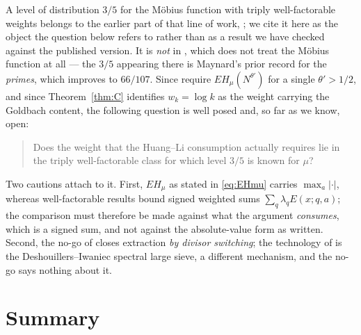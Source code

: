 \documentclass[11pt,a4paper]{article}
\theoremstyle{plain}
\theoremstyle{definition}
\theoremstyle{remark}
\begin{document}
A level of distribution $3/5$ for the M\"obius function with triply
well-factorable weights belongs to the earlier part of that line of
work, \cite{LiWF}; we cite it here as the object the question below
refers to rather than as a result we have checked against the
published version. It is \emph{not} in \cite{Li23}, which does not
treat the M\"obius function at all --- the $3/5$ appearing there is
Maynard's prior record for the \emph{primes}, which \cite{Li23}
improves to $66/107$. Since \cite{HL} require $EH_\mu(N^{\theta'})$
for a single $\theta'>1/2$, and since Theorem~\ref{thm:C} identifies
$w_k=\log k$ as the weight carrying the Goldbach content, the
following question is well posed and, so far as we know, open:

\begin{quote}
Does the weight that the Huang--Li consumption actually requires lie
in the triply well-factorable class for which level $3/5$ is known for
$\mu$?
\end{quote}

Two cautions attach to it. First, $EH_\mu$ as stated in
\eqref{eq:EHmu} carries $\max_a|\cdot|$, whereas well-factorable
results bound signed weighted sums $\sum_q\lambda_qE(x;q,a)$; the
comparison must therefore be made against what the argument
\emph{consumes}, which is a signed sum, and not against the
absolute-value form as written. Second, the no-go of \cite{P2} closes
extraction \emph{by divisor switching}; the technology of
\cite{Li23} is the Deshouillers--Iwaniec spectral large sieve, a
different mechanism, and the no-go says nothing about it.

\section{Summary}
\end{document}
